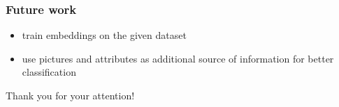 \documentclass[14pt]{beamer}
\begin{document}
		\begin{frame}
			\frametitle{Future work}
			\begin{itemize}
				\item train embeddings on the given dataset
				\item use pictures and attributes as additional source of information for better classification
			\end{itemize}
		\end{frame}
		

		\begin{frame}
			\begin{center}
					Thank you for your attention!
			\end{center}
		\end{frame}
		
	
\end{document}
